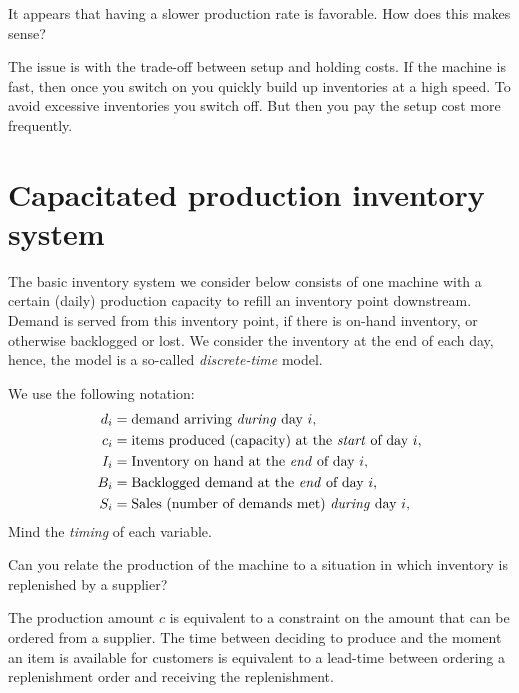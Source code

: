 \begin{exercise}
It appears that having a slower production rate is favorable. How does this makes sense?

\begin{solution}
The issue is with the trade-off between setup and holding costs. If the machine is fast, then once you switch on you quickly build up inventories at a high speed. To avoid excessive inventories you switch off. But then you pay the setup cost more frequently. 
\end{solution}
\end{exercise}

\section{Capacitated production inventory system}
\label{sec:capac-prod-invent}



The basic inventory system we consider below consists of one machine with a certain (daily) production capacity to refill an inventory point downstream. Demand is served from this inventory point, if there is on-hand inventory, or otherwise backlogged or lost. We consider the inventory at the end of each day, hence, the model is a so-called \emph{discrete-time} model.

We use the following notation:
\begin{align*}
  d_i &= \text{demand arriving \emph{during} day $i$}, \\
  c_i &= \text{items produced (capacity) at the \emph{start} of day $i$}, \\
  I_i &= \text{Inventory on hand at the \emph{end} of day $i$}, \\
  B_i &= \text{Backlogged demand at the \emph{end} of day $i$}, \\
  S_i &= \text{Sales (number of demands met) \emph{during}  day $i$}, \\
\end{align*}
Mind the \emph{timing} of each variable.

\begin{exercise}
  Can you relate the production of the machine to a situation in which
  inventory is replenished by a supplier?

  \begin{solution}
    The production amount $c$ is equivalent to a constraint on the
    amount that can be ordered from a supplier. The time between
    deciding to produce and the moment an item is available for
    customers is equivalent to a lead-time between ordering a
    replenishment order and receiving the replenishment.
  \end{solution}
\end{exercise}


